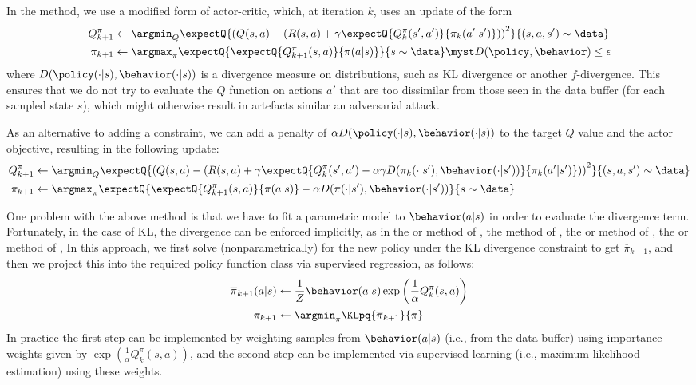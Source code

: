 In the  method,
we use a modified form of  actor-critic,  which, at iteration $k$,
uses an update of the form
\begin{align}
  Q^{\pi}_{k+1} &\leftarrow \argmin_Q \expectQ{
    \left(Q(s,a) - (R(s,a) + \gamma \expectQ{Q^{\pi}_k(s',a')}{\pi_k(a'|s')})
    \right)^2
  }{(s,a,s') \sim \data} \\
  \pi_{k+1} &\leftarrow \argmax_{\pi} \expectQ{
    \expectQ{Q^{\pi}_{k+1}(s,a)}{\pi(a|s)}}{s \sim \data}
  \myst D(\policy, \behavior) \leq \epsilon
  \label{eqn:piUpdate}
\end{align}
where $D(\policy(\cdot|s), \behavior(\cdot|s))$ is a divergence measure
on distributions, such as KL divergence or another $f$-divergence.
This ensures that we do not try to evaluate the $Q$ function
on actions $a'$ that are too dissimilar from those seen
in the data buffer (for each sampled state $s$),
which might otherwise result in artefacts similar
an  adversarial attack.


As an alternative to adding a constraint,
we can add a penalty of
$\alpha D(\policy(\cdot|s), \behavior(\cdot|s))$
to the target $Q$ value and the actor objective,
resulting in the following update:
\begin{align}
  Q^{\pi}_{k+1} &\leftarrow \argmin_Q \expectQ{
    \left(Q(s,a) - (R(s,a) + \gamma \expectQ{Q^{\pi}_k(s',a')
    -\alpha \gamma D(\pi_k(\cdot|s'), \behavior(\cdot|s'))}{\pi_k(a'|s')})
    \right)^2
  }{(s,a,s') \sim \data} \\
  \pi_{k+1} &\leftarrow \argmax_{\pi} \expectQ{
    \expectQ{Q^{\pi}_{k+1}(s,a)}{\pi(a|s)}
  - \alpha D(\pi(\cdot|s'), \behavior(\cdot|s'))}{s \sim \data}
\end{align}

One problem with the above method is that we have to fit
a parametric model to $\behavior(a|s)$ in order to evaluate the
divergence term. Fortunately, in the case of KL, the divergence
can be enforced implicitly,
as in the 
or  method of \citep{Peng2019awr},
the  method
of \citep{Peters07},
 the 
or  method of \citep{Nair2020},
the 
or  method of \citep{Siegel2020},
In this approach, we first solve (nonparametrically) for the new policy
under the KL divergence constraint to
get $\overline{\pi}_{k+1}$, and then we project
this into the required policy function class via
supervised regression, as follows:
\begin{align}
  \overline{\pi}_{k+1}(a|s) &\leftarrow \frac{1}{Z}
  \behavior(a|s) \exp\left( \frac{1}{\alpha} Q_k^{\pi}(s,a) \right) \\
  \pi_{k+1} &\leftarrow \argmin_{\pi} \KLpq{\overline{\pi}_{k+1}}{\pi}
\end{align}
In practice the first step can be implemented by weighting
samples from $\behavior(a|s)$ (i.e., from the data buffer)
using importance weights given by
$\exp\left( \frac{1}{\alpha} Q_k^{\pi}(s,a) \right)$,
and the second step can be implemented via  supervised
learning (i.e., maximum likelihood estimation) using
these weights.

